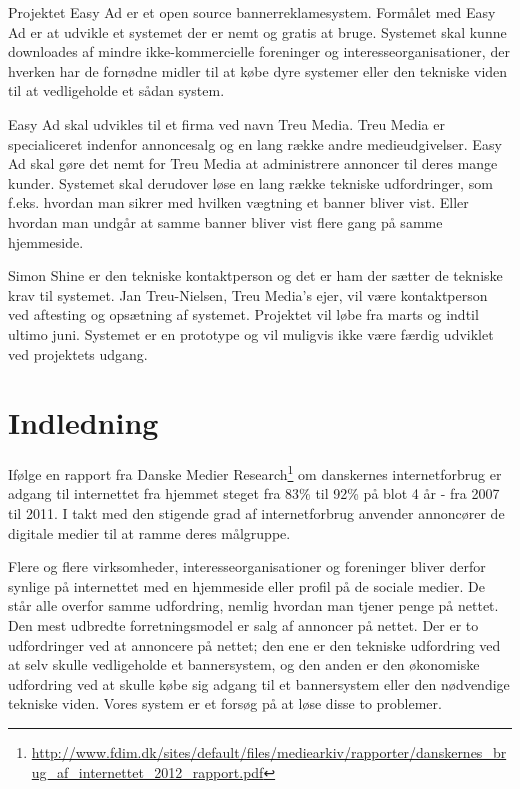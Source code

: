 \documentclass[a4paper,12pt]{article}
\begin{document}
Projektet Easy Ad er et open source bannerreklamesystem. Formålet med Easy Ad er at udvikle et systemet der er nemt og gratis at bruge. Systemet skal kunne downloades af mindre ikke-kommercielle foreninger og interesseorganisationer, der hverken har de fornødne midler til at købe dyre systemer eller den tekniske viden til at vedligeholde et sådan system.

Easy Ad skal udvikles til et firma ved navn Treu Media. Treu Media er specialiceret indenfor annoncesalg og en lang række andre medieudgivelser. Easy Ad skal gøre det nemt for Treu Media at administrere annoncer til deres mange kunder. Systemet skal derudover løse en lang række tekniske udfordringer, som f.eks. hvordan man sikrer med hvilken vægtning et banner bliver vist. Eller hvordan man undgår at samme banner bliver vist flere gang på samme hjemmeside.

Simon Shine er den tekniske kontaktperson og det er ham der sætter de tekniske krav til systemet. Jan Treu-Nielsen, Treu Media's ejer, vil være kontaktperson ved aftesting og opsætning af systemet. Projektet vil løbe fra marts og indtil ultimo juni. Systemet er en prototype og vil muligvis ikke være færdig udviklet ved projektets udgang. 

\newpage

\section{Indledning}

Ifølge en rapport fra Danske Medier Research\footnote{\url{ http://www.fdim.dk/sites/default/files/mediearkiv/rapporter/danskernes\_brug\_af\_internettet\_2012\_rapport.pdf}} om danskernes internetforbrug er adgang til internettet fra hjemmet steget fra 83\% til 92\% på blot 4 år - fra 2007 til 2011. I takt med den stigende grad af internetforbrug anvender annoncører de digitale medier til at ramme deres målgruppe.

Flere og flere virksomheder, interesseorganisationer og foreninger bliver derfor synlige på internettet med en hjemmeside eller profil på de sociale medier. De står alle overfor samme udfordring, nemlig hvordan man tjener penge på nettet. Den mest udbredte forretningsmodel er salg af annoncer på nettet. Der er to udfordringer ved at annoncere på nettet; den ene er den tekniske udfordring ved at selv skulle vedligeholde et bannersystem, og den anden er den økonomiske udfordring ved at skulle købe sig adgang til et bannersystem eller den nødvendige tekniske viden. Vores system er et forsøg på at løse disse to problemer.
\end{document}
